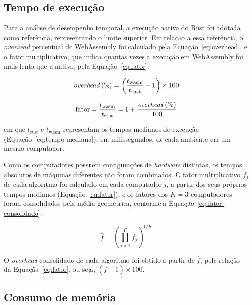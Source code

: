 \subsection{Tempo de execução}
\label{sec:tempo-execucao}

Para a análise de desempenho temporal, a execução nativa do Rust foi adotada como referência, representando o limite superior. Em relação a essa referência, o \emph{overhead} percentual do WebAssembly foi calculado pela Equação~\eqref{eq:overhead}, e o fator multiplicativo, que indica quantas vezes a execução em WebAssembly foi mais lenta que a nativa, pela Equação~\eqref{eq:fator}:

\begin{equation}
\label{eq:overhead}
\text{\emph{overhead}}\,(\%) = \left( \frac{t_{\text{wasm}}}{t_{\text{rust}}} - 1 \right) \times 100
\end{equation}

\begin{equation}
\label{eq:fator}
\text{fator} = \frac{t_{\text{wasm}}}{t_{\text{rust}}} = 1 + \frac{\text{\emph{overhead}}\,(\%)}{100}
\end{equation}

\noindent em que $t_{\text{rust}}$ e $t_{\text{wasm}}$ representam os tempos medianos de execução (Equação~\eqref{eq:tempo-mediano}), em milissegundos, de cada ambiente em um mesmo computador.

Como os computadores possuem configurações de \emph{hardware} distintas, os tempos absolutos de máquinas diferentes não foram combinados. O fator multiplicativo $f_j$ de cada algoritmo foi calculado em cada computador $j$, a partir dos seus próprios tempos medianos (Equação~\eqref{eq:fator}), e os fatores dos $K = 3$ computadores foram consolidados pela média geométrica, conforme a Equação~\eqref{eq:fator-consolidado}:

\begin{equation}
\label{eq:fator-consolidado}
\bar{f} = \left( \prod_{j=1}^{K} f_j \right)^{1/K}
\end{equation}

O \emph{overhead} consolidado de cada algoritmo foi obtido a partir de $\bar{f}$, pela relação da Equação~\eqref{eq:fator}, ou seja, $(\bar{f} - 1) \times 100$.

\subsection{Consumo de memória}
\label{sec:consumo-memoria}

